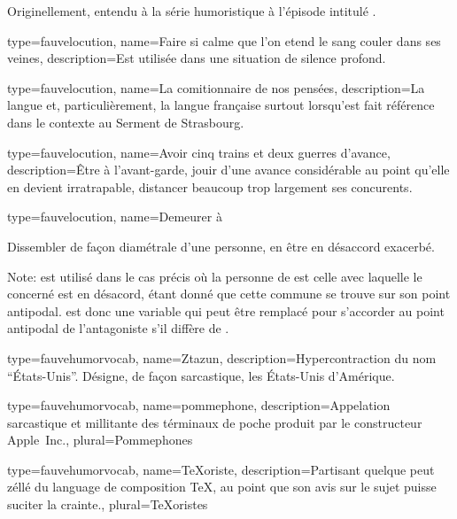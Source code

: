 {{{  Originellement, entendu à la série humoristique  à l’épisode intitulé .
}

{
  type=fauvelocution,
    name={Faire si calme que l’on etend le sang couler dans ses veines},
    description={Est utilisée dans une situation de silence profond.}
}

{
  type=fauvelocution,
    name={La comitionnaire de nos pensées},
    description={La langue et, particulièrement, la langue française surtout lorsqu’est fait référence dans le contexte au Serment de Strasbourg.}
}

{
  type=fauvelocution,
    name={Avoir cinq trains et deux guerres d’avance},
    description={Être à l’avant-garde, jouir d’une avance considérable au point qu’elle en devient irratrapable, distancer beaucoup trop largement ses concurents.}
}

{
  type=fauvelocution,
    name={Demeurer à }
}
{
  Dissembler de façon diamétrale d’une personne, en être en désaccord exacerbé.

  Note:  est utilisé dans le cas précis où la personne de  est celle avec laquelle le concerné est en désacord, étant donné que cette commune se trouve sur son point antipodal.  est donc une variable qui peut être remplacé pour s’accorder au point antipodal de l’antagoniste s’il diffère de .
}


{
  type=fauvehumorvocab,
    name={Ztazun},
    description={Hypercontraction du nom \enquote{États-Unis}. Désigne, de façon sarcastique, les États-Unis d’Amérique.}
}

{
  type=fauvehumorvocab,
    name={pommephone},
    description={Appelation sarcastique et millitante des términaux de poche produit par le constructeur Apple~Inc.},
    plural={Pommephones}
}

{
  type=fauvehumorvocab,
    name={\TeX oriste},
    description={Partisant quelque peut zéllé du language de composition \TeX{}, au point que son avis sur le sujet puisse suciter la crainte.},
    plural={\TeX oristes}
}

}}

